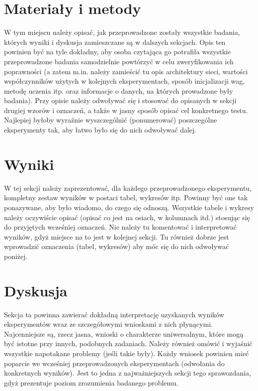 \documentclass{classrep}
\begin{document}
\section{Materiały i metody}
{\color{blue}
W tym miejscu należy opisać, jak przeprowadzone zostały wszystkie badania,
których wyniki i dyskusja zamieszczane są w dalszych sekcjach. Opis ten
powinien być na tyle dokładny, aby osoba czytająca go potrafiła wszystkie
przeprowadzone badania samodzielnie powtórzyć w celu zweryfikowania ich
poprawności (a zatem m.in. należy zamieścić tu opis architektury sieci,
wartości współczynników użytych w kolejnych eksperymentach, sposób
inicjalizacji wag, metodę uczenia itp. oraz informacje o danych, na których
prowadzone były badania). Przy opisie należy odwoływać się i stosować do
opisanych w sekcji drugiej wzorów i oznaczeń, a także w jasny sposób opisać
cel konkretnego testu. Najlepiej byłoby wyraźnie wyszczególnić (ponumerować)
poszczególne eksperymenty tak, aby łatwo było się do nich odwoływać dalej.}

\section{Wyniki}
{\color{blue}
W tej sekcji należy zaprezentować, dla każdego przeprowadzonego eksperymentu,
kompletny zestaw wyników w postaci tabel, wykresów itp. Powinny być one tak
ponazywane, aby było wiadomo, do czego się odnoszą. Wszystkie tabele i wykresy
należy oczywiście opisać (opisać co jest na osiach, w kolumnach itd.) stosując
się do przyjętych wcześniej oznaczeń. Nie należy tu komentować i interpretować
wyników, gdyż miejsce na to jest w kolejnej sekcji. Tu również dobrze jest
wprowadzić oznaczenia (tabel, wykresów) aby móc się do nich odwoływać
poniżej.}

\section{Dyskusja}
{\color{blue}
Sekcja ta powinna zawierać dokładną interpretację uzyskanych wyników
eksperymentów wraz ze szczegółowymi wnioskami z nich płynącymi. Najcenniejsze
są, rzecz jasna, wnioski o charakterze uniwersalnym, które mogą być istotne
przy innych, podobnych zadaniach. Należy również omówić i wyjaśnić wszystkie
napotakane problemy (jeśli takie były). Każdy wniosek powinien mieć poparcie
we wcześniej przeprowadzonych eksperymentach (odwołania do konkretnych
wyników). Jest to jedna z najważniejszych sekcji tego sprawozdania, gdyż
prezentuje poziom zrozumienia badanego problemu.}
\end{document}
